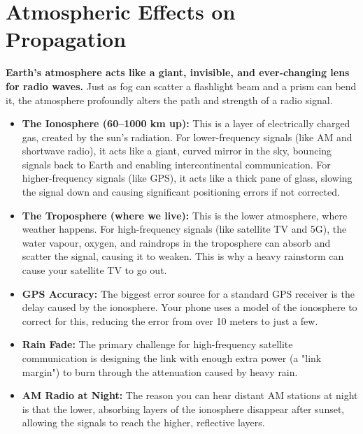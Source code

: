 
\chapter{Atmospheric Effects on Propagation}
\label{ch:atmospheric}

\begin{nontechnical}
    \textbf{Earth's atmosphere acts like a giant, invisible, and ever-changing lens for radio waves.} Just as fog can scatter a flashlight beam and a prism can bend it, the atmosphere profoundly alters the path and strength of a radio signal.

    \begin{itemize}
        \item \textbf{The Ionosphere (60--1000 km up):} This is a layer of electrically charged gas, created by the sun's radiation. For lower-frequency signals (like AM and shortwave radio), it acts like a giant, curved mirror in the sky, bouncing signals back to Earth and enabling intercontinental communication. For higher-frequency signals (like GPS), it acts like a thick pane of glass, slowing the signal down and causing significant positioning errors if not corrected.
        \item \textbf{The Troposphere (where we live):} This is the lower atmosphere, where weather happens. For high-frequency signals (like satellite TV and 5G), the water vapour, oxygen, and raindrops in the troposphere can absorb and scatter the signal, causing it to weaken. This is why a heavy rainstorm can cause your satellite TV to go out.
    \end{itemize}

    \begin{itemize}
        \item \textbf{GPS Accuracy:} The biggest error source for a standard GPS receiver is the delay caused by the ionosphere. Your phone uses a model of the ionosphere to correct for this, reducing the error from over 10 meters to just a few.
        \item \textbf{Rain Fade:} The primary challenge for high-frequency satellite communication is designing the link with enough extra power (a "link margin") to burn through the attenuation caused by heavy rain.
        \item \textbf{AM Radio at Night:} The reason you can hear distant AM stations at night is that the lower, absorbing layers of the ionosphere disappear after sunset, allowing the signals to reach the higher, reflective layers.
    \end{itemize}
\end{nontechnical}


